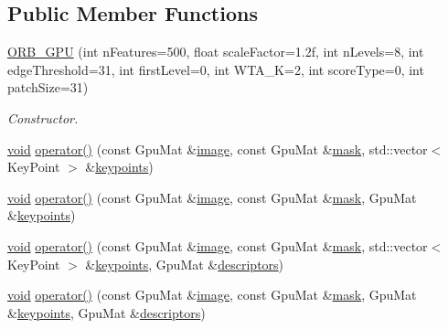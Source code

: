 \subsection*{Public Member Functions}
\begin{DoxyCompactItemize}
\item 
\hyperlink{classcv_1_1gpu_1_1ORB__GPU_a17e39338408eda52ffa9e35942f94aac}{O\-R\-B\-\_\-\-G\-P\-U} (int n\-Features=500, float scale\-Factor=1.\-2f, int n\-Levels=8, int edge\-Threshold=31, int first\-Level=0, int W\-T\-A\-\_\-\-K=2, int score\-Type=0, int patch\-Size=31)
\begin{DoxyCompactList}\small\item\em Constructor. \end{DoxyCompactList}\item 
\hyperlink{legacy_8hpp_a8bb47f092d473522721002c86c13b94e}{void} \hyperlink{classcv_1_1gpu_1_1ORB__GPU_a82edecc365d6cb31063572d83dcfc4f4}{operator()} (const Gpu\-Mat \&\hyperlink{legacy_8hpp_ad62b16ab219ae2483e8a3d921c44cc97}{image}, const Gpu\-Mat \&\hyperlink{tracking_8hpp_a6b13ecd2fd6ec7ad422f1d7863c3ad19}{mask}, std\-::vector$<$ Key\-Point $>$ \&\hyperlink{compat_8hpp_af95b6678bbbdd664ed15fe6d4190d355}{keypoints})
\item 
\hyperlink{legacy_8hpp_a8bb47f092d473522721002c86c13b94e}{void} \hyperlink{classcv_1_1gpu_1_1ORB__GPU_a2d02ebdf4956fb1bb05980d4c323a5d1}{operator()} (const Gpu\-Mat \&\hyperlink{legacy_8hpp_ad62b16ab219ae2483e8a3d921c44cc97}{image}, const Gpu\-Mat \&\hyperlink{tracking_8hpp_a6b13ecd2fd6ec7ad422f1d7863c3ad19}{mask}, Gpu\-Mat \&\hyperlink{compat_8hpp_af95b6678bbbdd664ed15fe6d4190d355}{keypoints})
\item 
\hyperlink{legacy_8hpp_a8bb47f092d473522721002c86c13b94e}{void} \hyperlink{classcv_1_1gpu_1_1ORB__GPU_a7175b92d122b0234c9cf9547817d79d2}{operator()} (const Gpu\-Mat \&\hyperlink{legacy_8hpp_ad62b16ab219ae2483e8a3d921c44cc97}{image}, const Gpu\-Mat \&\hyperlink{tracking_8hpp_a6b13ecd2fd6ec7ad422f1d7863c3ad19}{mask}, std\-::vector$<$ Key\-Point $>$ \&\hyperlink{compat_8hpp_af95b6678bbbdd664ed15fe6d4190d355}{keypoints}, Gpu\-Mat \&\hyperlink{compat_8hpp_a1e3702ddbca6258f57508c22eff26bf2}{descriptors})
\item 
\hyperlink{legacy_8hpp_a8bb47f092d473522721002c86c13b94e}{void} \hyperlink{classcv_1_1gpu_1_1ORB__GPU_a29dd0d3f841bb98eb0abe1d091b977e7}{operator()} (const Gpu\-Mat \&\hyperlink{legacy_8hpp_ad62b16ab219ae2483e8a3d921c44cc97}{image}, const Gpu\-Mat \&\hyperlink{tracking_8hpp_a6b13ecd2fd6ec7ad422f1d7863c3ad19}{mask}, Gpu\-Mat \&\hyperlink{compat_8hpp_af95b6678bbbdd664ed15fe6d4190d355}{keypoints}, Gpu\-Mat \&\hyperlink{compat_8hpp_a1e3702ddbca6258f57508c22eff26bf2}{descriptors})

\end{DoxyCompactItemize}

